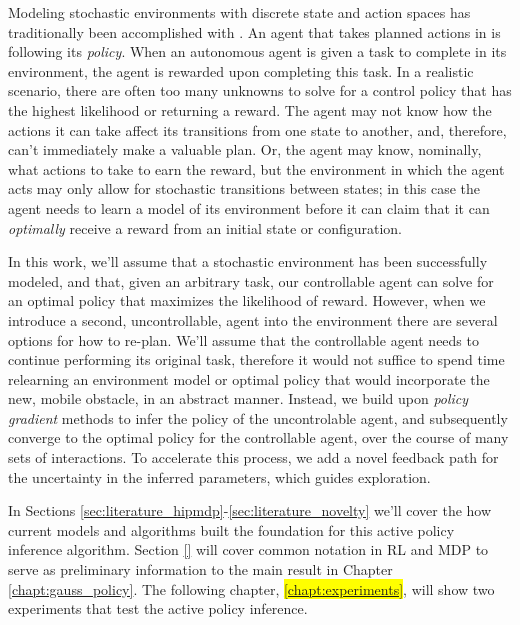     Modeling stochastic environments with discrete state and action spaces has traditionally been accomplished with
    . An agent that takes planned actions in  is following its \textit{policy}. When an autonomous
    agent is given a task to complete in its environment, the agent is rewarded upon completing this task. In a
    realistic scenario, there are often too many unknowns to solve for a control policy that has the highest likelihood
    or returning a reward. The agent may not know how the actions it can take affect its transitions from one state to
    another, and, therefore, can't immediately make a valuable plan. Or, the agent may know, nominally, what actions to
    take to earn the reward, but the environment in which the agent acts may only allow for stochastic transitions
    between states; in this case the agent needs to learn a model of its environment before it can claim that it can
    \textit{optimally} receive a reward from an initial state or configuration.

    In this work, we'll assume that a stochastic environment has been successfully modeled, and that, given an arbitrary
    task, our controllable agent can solve for an optimal policy that maximizes the likelihood of reward. However, when
    we introduce a second, uncontrollable, agent into the environment there are several options for how to re-plan.
    We'll assume that the controllable agent needs to continue performing its original task, therefore it would not
    suffice to spend time relearning an environment model or optimal policy that would incorporate the new, mobile
    obstacle, in an abstract manner.  Instead, we build upon \textit{policy gradient} methods to infer the policy of the
    uncontrolable agent, and subsequently converge to the optimal policy for the controllable agent, over the course of
    many sets of interactions. To accelerate this process, we add a novel feedback path for the uncertainty in the
    inferred parameters, which guides exploration.

    In Sections \ref{sec:literature_hipmdp}-\ref{sec:literature_novelty} we'll cover the how current models and
    algorithms built the foundation for this active policy inference algorithm. Section \ref{} will cover common
    notation in \ac{RL} and \ac{MDP} to serve as preliminary information to the main result in Chapter
    \ref{chapt:gauss_policy}. The following chapter, \colorbox{yellow}{\ref{chapt:experiments}}, will show two
    experiments that test the active policy inference.


